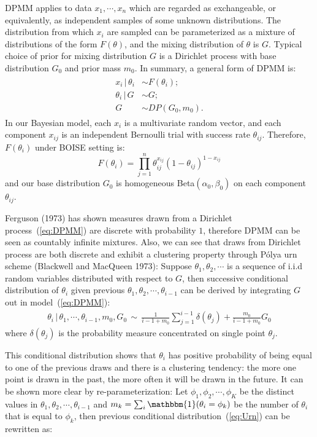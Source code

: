 \documentclass[12pt]{article}
\begin{document}
DPMM applies to data $x_1,\cdots,x_n$ which are regarded as exchangeable, or equivalently, as independent samples of some unknown distributions. The distribution from which $x_i$ are sampled can be parameterized as a mixture of distributions of the form $F(\theta)$, and the mixing distribution of $\theta$ is $G$. Typical choice of prior for mixing distribution $G$ is a Dirichlet process with base distribution $G_0$ and prior mass $m_0$. In summary, a general form of DPMM is:
\begin{align}
\label{eq:DPMM}
\begin{split}
    x_i\, | \, \theta_i &\sim F(\theta_i);\\
    \theta_i\, |\, G &\sim G;\\
    G &\sim DP(G_0,m_0).
\end{split}
\end{align}
In our Bayesian model, each $x_i$ is a multivariate random vector, and each component $x_{ij}$ is an independent Bernoulli trial with success rate $\theta_{ij}$. Therefore, $F(\theta_i)$ under BOISE setting is:
\begin{equation*}
    F(\theta_i) = \prod_{j=1}^n \theta_{ij}^{x_{ij}}\left(1-\theta_{ij}\right)^{1-x_{ij}}
\end{equation*}
and our base distribution $G_0$ is homogeneous Beta$(\alpha_0,\beta_0)$ on each component $\theta_{ij}$.

Ferguson (1973) has shown measures drawn from a Dirichlet process~(\ref{eq:DPMM}) are discrete with probability $1$, therefore DPMM can be seen as countably infinite mixtures. Also, we can see that draws from Dirichlet process are both discrete and exhibit a clustering property through P\'{o}lya urn scheme (Blackwell and MacQueen 1973): Suppose $\theta_1,\theta_2,\cdots$ is a sequence of i.i.d random variables distributed with respect to $G$, then successive conditional distribution of $\theta_i$ given previous $\theta_1, \theta_2,\cdots,\theta_{i-1}$ can be derived by integrating $G$ out in model~(\ref{eq:DPMM}):
\begin{eqnarray}
\label{eq:Urn}
    \theta_i\,|\, \theta_1,\cdots,\theta_{i-1},m_0,G_0 \, \sim\, \frac{1}{i-1+m_0}\sum_{j=1}^{i-1}\delta(\theta_j) + \frac{m_0}{i-1+m_0}G_0
\end{eqnarray}
where $\delta(\theta_j)$ is the probability measure concentrated on single point $\theta_j$. 

This conditional distribution shows that $\theta_i$ has positive probability of being equal to one of the previous draws and there is a clustering tendency: the more one point is drawn in the past, the more often it will be drawn in the future. It can be shown more clear by re-parameterization: Let $\phi_1,\phi_2,\cdots,\phi_K$ be the distinct values in $\theta_1,\theta_2,\cdots,\theta_{i-1}$ and $m_k = \sum_i \mathbbm{1}(\theta_i=\phi_k)$ be the number of $\theta_i$ that is equal to $\phi_k$, then previous conditional distribution~(\ref{eq:Urn}) can be rewritten as:
\end{document}
